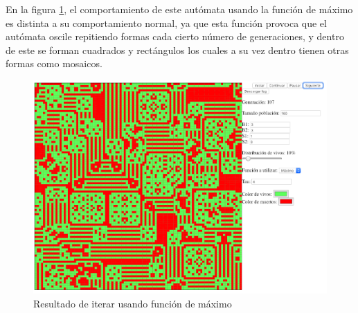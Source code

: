 	En la figura \ref{fig:golm23}, el comportamiento de este autómata usando la función de máximo es distinta a su comportamiento normal, ya que esta función provoca que el autómata oscile repitiendo formas cada cierto número de generaciones, y dentro de este se forman cuadrados y rectángulos los cuales a su vez dentro tienen otras formas como mosaicos.
	\begin{figure}[H]
		\begin{center}
			\includegraphics[scale=.3]{GOLM/img/regla3318-1.png}
			\caption{Resultado de iterar usando función de máximo}
			\label{fig:golm23}
		\end{center}
	\end{figure}

